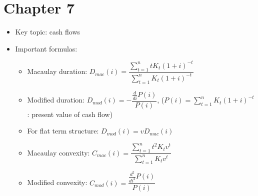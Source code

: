 \documentclass{article}
\begin{document}
\section*{Chapter 7}
\begin{itemize}
	\item Key topic: cash flows
	\item Important formulas:
	\begin{itemize}
		\item Macaulay duration: $D_{mac}(i)=\dfrac{\sum_{t=1}^ntK_t(1+i)^{-t}}{\sum_{t=1}^nK_t(1+i)^{-t}}$
		\item Modified duration: $D_{mod}(i)=-\dfrac{\frac{d}{di}P(i)}{P(i)}$, ($P(i)=\sum_{t=1}^nK_t(1+i)^{-t}$: present value of cash flow)
		\item For flat term structure: $D_{mod}(i)=vD_{mac}(i)$
		\item Macaulay convexity: $C_{mac}(i)=\dfrac{\sum_{t=1}^nt^2K_tv^t}{\sum_{t=1}^nK_tv^t}$
		\item Modified convexity: $C_{mod}(i)=\dfrac{\frac{d^2}{di^2}P(i)}{P(i)}$
	\end{itemize}
\end{itemize}
\end{document}
